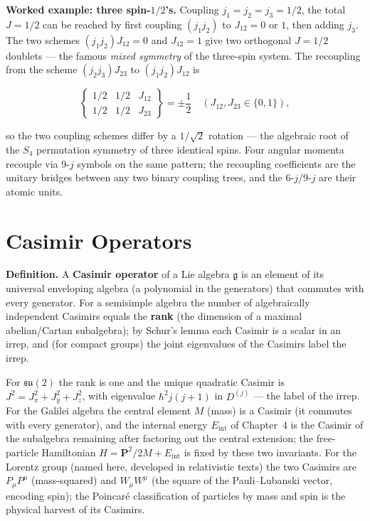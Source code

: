 \medskip\noindent\textbf{Worked example: three spin-$1/2$'s.} Coupling $j_{1}=j_{2}=j_{3}=1/2$, the total $J=1/2$ can be reached by first coupling $(j_{1}j_{2})$ to $J_{12}=0$ or $1$, then adding $j_{3}$. The two schemes $(j_{1}j_{2})J_{12}=0$ and $J_{12}=1$ give two orthogonal $J=1/2$ doublets --- the famous \emph{mixed symmetry} of the three-spin system. The recoupling from the scheme $(j_{2}j_{3})J_{23}$ to $(j_{1}j_{2})J_{12}$ is
\begin{linenomath}
\begin{equation*}
\begin{Bmatrix}1/2&1/2&J_{12}\\ 1/2&1/2&J_{23}\end{Bmatrix}=\pm\frac{1}{2}\quad(J_{12},J_{23}\in\{0,1\}),
\end{equation*}
\end{linenomath}
so the two coupling schemes differ by a $1/\sqrt2$ rotation --- the algebraic root of the $S_{4}$ permutation symmetry of three identical spins. Four angular momenta recouple via 9-$j$ symbols on the same pattern; the recoupling coefficients are the unitary bridges between any two binary coupling trees, and the 6-$j$/9-$j$ are their atomic units.

\section{Casimir Operators}
\label{sec:appendix-casimir}

\medskip\noindent\textbf{Definition.} A \textbf{Casimir operator} of a Lie algebra $\mathfrak g$ is an element of its universal enveloping algebra (a polynomial in the generators) that commutes with every generator. For a semisimple algebra the number of algebraically independent Casimirs equals the \textbf{rank} (the dimension of a maximal abelian/Cartan subalgebra); by Schur's lemma each Casimir is a scalar in an irrep, and (for compact groups) the joint eigenvalues of the Casimirs label the irrep.

For $\mathfrak{su}(2)$ the rank is one and the unique quadratic Casimir is $J^{2}=J_{x}^{2}+J_{y}^{2}+J_{z}^{2}$, with eigenvalue $\hbar^{2}j(j+1)$ in $D^{(j)}$ --- the label of the irrep. For the Galilei algebra the central element $M$ (mass) is a Casimir (it commutes with every generator), and the internal energy $E_{\mathrm{int}}$ of Chapter~4 is the Casimir of the subalgebra remaining after factoring out the central extension; the free-particle Hamiltonian $H=\bm P^{2}/2M+E_{\mathrm{int}}$ is fixed by these two invariants. For the Lorentz group (named here, developed in relativistic texts) the two Casimirs are $P_{\mu}P^{\mu}$ (mass-squared) and $W_{\mu}W^{\mu}$ (the square of the Pauli--Lubanski vector, encoding spin); the Poincar\'e classification of particles by mass and spin is the physical harvest of its Casimirs.

